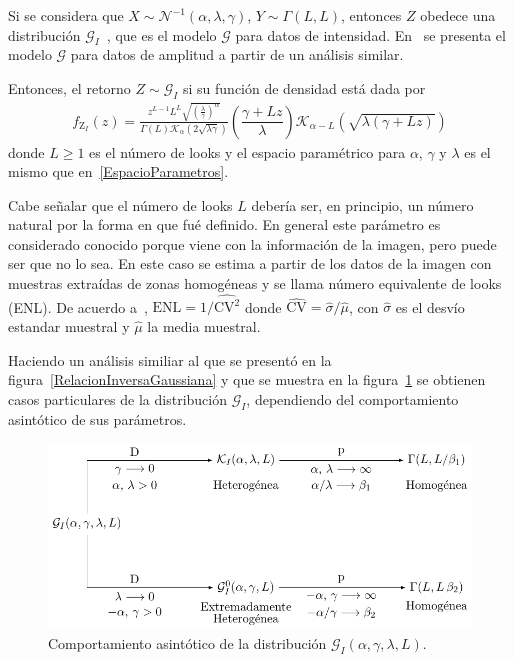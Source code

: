 Si se considera que $X \sim \mathcal{N}^{-1}(\alpha,\lambda,\gamma )$, $Y \sim \Gamma(L,L)$, entonces $Z$ obedece una distribución $\mathcal G_I$~\cite{Frery99}, que es el modelo $\mathcal{G}$ para datos de intensidad. En~\cite{Frery97} se presenta el modelo $\mathcal{G}$ para datos de amplitud a partir de un análisis similar.

Entonces, el retorno $Z \sim \mathcal{G}_I$ si su función de densidad está dada por
\begin{align}
\label{ModeloGI}
f_{\text{Z}_I}( z) =\frac{z^{L-1} L^L \sqrt{(\frac{\lambda}{\gamma})^{\alpha}}}{\Gamma(L)\mathcal{K}_{\alpha}(2 \sqrt{\lambda \gamma})} \left(\dfrac{\gamma + Lz}{\lambda}\right) \mathcal{K}_{\alpha-L}(\sqrt{\lambda(\gamma+Lz) })
\end{align}
donde $L\geq 1$ es el número de looks y el espacio paramétrico para $\alpha$, $\gamma$ y $\lambda$ es el mismo que en~\ref{EspacioParametros}.

Cabe señalar que el número de looks $L$ debería ser, en principio, un número natural por la forma en que fué definido. En general este parámetro es considerado conocido porque viene con la información de la imagen, pero puede ser que no lo sea. En este caso se estima a partir de los datos de la imagen con muestras extraídas de zonas homogéneas y se llama número equivalente de looks (ENL). De acuerdo a~\cite{anfinsen2009}, $\text{ENL}={1}/{\widehat{\text{CV}^2}}$ donde $\widehat{\text{CV}}={\widehat{\sigma}}/{\widehat\mu}$, con $\widehat{\sigma}$ es el desvío estandar muestral y $\widehat\mu$ la media muestral.

Haciendo un análisis similiar al que se presentó en la figura~\ref{RelacionInversaGaussiana} y que se muestra en la figura~\ref{RelacionGI} se obtienen casos particulares de la distribución $\mathcal{G}_I$, dependiendo del comportamiento asintótico de sus parámetros.
\begin{figure}[hbt]
	\centering    
	\includegraphics[scale=1]{../../Figures/Tesis/Capitulo4/RelacionGI.pdf}
	\caption{\label{RelacionGI}Comportamiento asintótico de la distribución $\mathcal{G}_I(\alpha,\gamma,\lambda,L)$.} %
\end{figure} 

